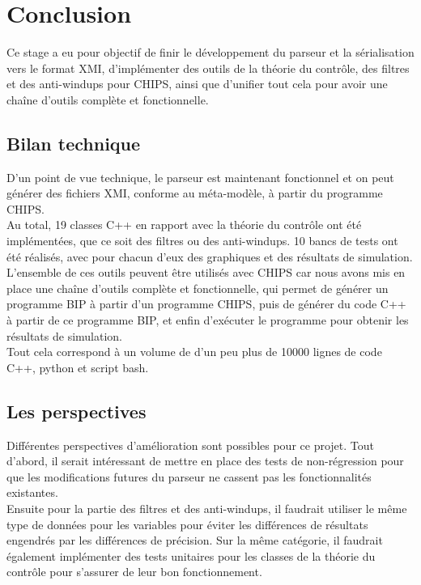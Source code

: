 \section{Conclusion}
\label{sec:conclusion}
Ce stage a eu pour objectif de finir le développement du parseur et la sérialisation vers le format XMI, d'implémenter des outils de la théorie du contrôle, des filtres et des anti-windups pour CHIPS, ainsi que d'unifier tout cela pour avoir une chaîne d'outils complète et fonctionnelle.

\subsection{Bilan technique}
\label{sec:bilan_technique}

D'un point de vue technique, le parseur est maintenant fonctionnel et on peut générer des fichiers XMI, conforme au méta-modèle, à partir du programme CHIPS. \\

Au total, 19 classes C++ en rapport avec la théorie du contrôle ont été implémentées, que ce soit des filtres ou des anti-windups. 10 bancs de tests ont été réalisés, avec pour chacun d'eux des graphiques et des résultats de simulation. L'ensemble de ces outils peuvent être utilisés avec CHIPS car nous avons mis en place une chaîne d'outils complète et fonctionnelle, qui permet de générer un programme BIP à partir d'un programme CHIPS, puis de générer du code C++ à partir de ce programme BIP, et enfin d'exécuter le programme pour obtenir les résultats de simulation. \\

Tout cela correspond à un volume de d'un peu plus de 10000 lignes de code C++, python et script bash. \\

\subsection{Les perspectives}
\label{sec:perspectives}

Différentes perspectives d'amélioration sont possibles pour ce projet. Tout d'abord, il serait intéressant de mettre en place des tests de non-régression pour que les modifications futures du parseur ne cassent pas les fonctionnalités existantes. \\

Ensuite pour la partie des filtres et des anti-windups, il faudrait utiliser le même type de données pour les variables pour éviter les différences de résultats engendrés par les différences de précision. Sur la même catégorie, il faudrait également implémenter des tests unitaires pour les classes de la théorie du contrôle pour s'assurer de leur bon fonctionnement. \\

